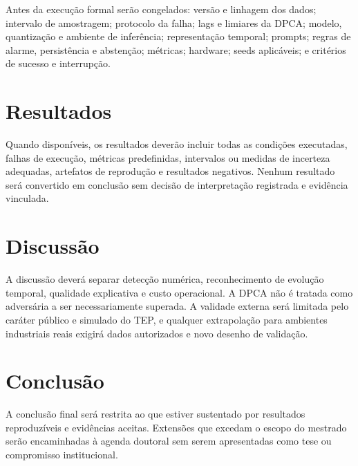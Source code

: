 \documentclass[a4paper,12pt]{abntex2}
\begin{document}
\ResearchHypothesisPT

Antes da execução formal serão congelados: versão e linhagem dos dados; intervalo de amostragem; protocolo da falha; lags e limiares da DPCA; modelo, quantização e ambiente de inferência; representação temporal; prompts; regras de alarme, persistência e abstenção; métricas; hardware; seeds aplicáveis; e critérios de sucesso e interrupção.

\chapter{Resultados}
\ResultsStatusPT

Quando disponíveis, os resultados deverão incluir todas as condições executadas, falhas de execução, métricas predefinidas, intervalos ou medidas de incerteza adequadas, artefatos de reprodução e resultados negativos. Nenhum resultado será convertido em conclusão sem decisão de interpretação registrada e evidência vinculada.

\chapter{Discussão}
\ResearchLimitationsPT

A discussão deverá separar detecção numérica, reconhecimento de evolução temporal, qualidade explicativa e custo operacional. A DPCA não é tratada como adversária a ser necessariamente superada. A validade externa será limitada pelo caráter público e simulado do TEP, e qualquer extrapolação para ambientes industriais reais exigirá dados autorizados e novo desenho de validação.

\chapter{Conclusão}
\ResearchContributionPT

A conclusão final será restrita ao que estiver sustentado por resultados reproduzíveis e evidências aceitas. Extensões que excedam o escopo do mestrado serão encaminhadas à agenda doutoral sem serem apresentadas como tese ou compromisso institucional.

\printbibliography[title={Referências}]
\end{document}
